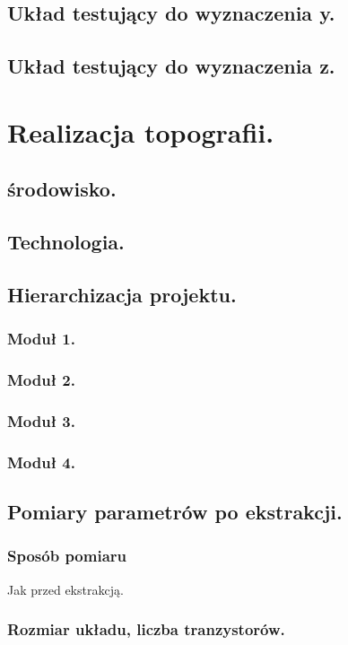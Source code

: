 \documentclass[10pt,a4paper]{report}
\begin{document}
	\section{Układ testujący do wyznaczenia y.}
	\section{Układ testujący do wyznaczenia z.}
	
	\chapter{Realizacja topografii.}
	\section{środowisko.}
	\section{Technologia.}
	\section{Hierarchizacja projektu.}
	\subsection{Moduł 1.}
	\subsection{Moduł 2.}
	\subsection{Moduł 3.}
	\subsection{Moduł 4.}
	
	\section{Pomiary parametrów po ekstrakcji.}
	\subsection{Sposób pomiaru}
	Jak przed ekstrakcją.
	\subsection{Rozmiar układu, liczba tranzystorów.}
\end{document}
